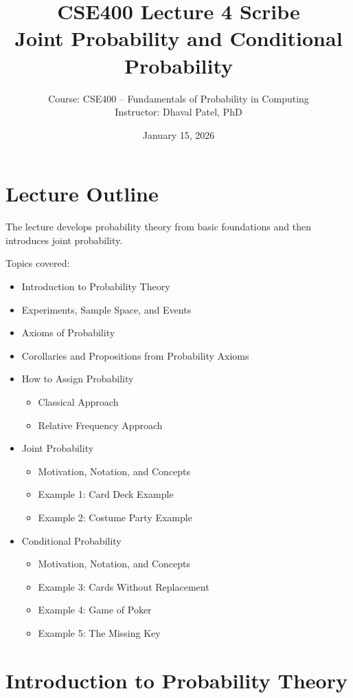 \documentclass[12pt]{article}
\title{\textbf{CSE400 Lecture 4 Scribe}\\
Joint Probability and Conditional Probability}
\author{Course: CSE400 -- Fundamentals of Probability in Computing\\
Instructor: Dhaval Patel, PhD}
\date{January 15, 2026}
\begin{document}
\maketitle

\section{Lecture Outline}

The lecture develops probability theory from basic foundations and then introduces
joint probability.

Topics covered:

\begin{itemize}
    \item Introduction to Probability Theory
    \item Experiments, Sample Space, and Events
    \item Axioms of Probability
    \item Corollaries and Propositions from Probability Axioms
    \item How to Assign Probability
    \begin{itemize}
        \item Classical Approach
        \item Relative Frequency Approach
    \end{itemize}
    \item Joint Probability
    \begin{itemize}
        \item Motivation, Notation, and Concepts
        \item Example 1: Card Deck Example
        \item Example 2: Costume Party Example
    \end{itemize}
    \item Conditional Probability
    \begin{itemize}
        \item Motivation, Notation, and Concepts
        \item Example 3: Cards Without Replacement
        \item Example 4: Game of Poker
        \item Example 5: The Missing Key
    \end{itemize}
\end{itemize}

\section{Introduction to Probability Theory}
\end{document}
